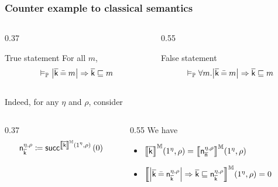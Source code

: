 \documentclass[aspectratio=169]{beamer}
\begin{document}
\begin{frame}
  \frametitle{Counter example to classical semantics}

  \begin{columns}
    \begin{column}{0.37\textwidth}
      \begin{block}{{\color{tugreen} True} statement}
        For all $m$,
        \vspace*{-1mm}\[
          \validp \meval{\mk \beq m}\Rightarrow \mk \sqsubseteq m
        \]
      \end{block}\pause
    \end{column}

    \begin{column}{0.55\textwidth}
      \begin{block}{{\color{tumagenta} False} statement}
        \[
          \validp \forall m. \meval{\mk \beq m}\Rightarrow \mk \sqsubseteq m
        \]
      \end{block}
    \end{column}
  \end{columns}\pause
  \vspace*{3mm}
  Indeed, for any $\eta$ and $\rho$, consider

  \begin{columns}
    \begin{column}{0.37\textwidth}
      \[
        \mathsf{n}^{\eta,\rho}_{\mk}\coloneqq \mathsf{succ}^{\bcint{\mk}{\eta}{\rho}}\left( 0 \right)
      \]\pause
    \end{column}
    \begin{column}{0.55\textwidth}
      We have
      \begin{itemize}[<+->]
        \item $ \bcint{\mk}{\eta}{\rho} = \bcint{\mathsf{n}^{\eta,\rho}_{\n}}{\eta}{\rho}$
        \item $ \bcint{\meval{\mk \beq \mathsf{n}^{\eta,\rho}_{\mk}}\Rightarrow \mk \sqsubseteq \mathsf{n}^{\eta,\rho}_{\mk}}{\eta}{\rho} = 0 $
      \end{itemize}
    \end{column}
  \end{columns}


\end{frame}
\end{document}
